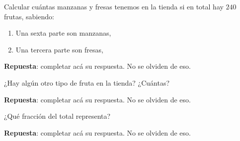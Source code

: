 \documentclass[11pt]{examdesign}
\theoremstyle{plain}
\theoremstyle{definition}
\theoremstyle{remark}
\begin{document}
    \begin{shortanswer}[title={\textit{Más problemas con fracciones...}},
    	rearrange=no,resetcounter=yes]
    	\begin{question}
    		Calcular cuántas manzanas y fresas tenemos en la tienda si en total hay $240$ frutas, sabiendo:
    		\begin{enumerate}
    			\item  Una sexta parte son manzanas,
    			
    			\item  Una tercera parte son fresas,	
    		\end{enumerate}
    		
    		\begin{answer}
    			\textbf{Repuesta}: completar acá su respuesta. No se olviden de eso.
    		\end{answer}
    	\end{question}
    
    	\begin{question}
    		¿Hay algún otro tipo de fruta en la tienda? ¿Cuántas?
    		
    		\begin{answer}
    			\textbf{Repuesta}: completar acá su respuesta. No se olviden de eso.
    		\end{answer}
    	\end{question}
    
        \begin{question}
        	 ¿Qué fracción del total representa?
        	
        	\begin{answer}
        		\textbf{Repuesta}: completar acá su respuesta. No se olviden de eso.
        	\end{answer}
        \end{question}
    \end{shortanswer}
\end{document}
